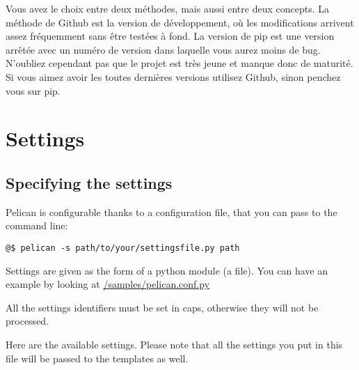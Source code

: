 \documentclass[letterpaper,10pt,english]{manual}
\begin{document}
Vous avez le choix entre deux méthodes, mais aussi entre deux concepts. La méthode
de Github est la version de développement, où les modifications arrivent assez
fréquemment sans être testées à fond. La version de pip est une version arrêtée avec un
numéro de version dans laquelle vous aurez moins de bug. N’oubliez cependant pas
que le projet est très jeune et manque donc de maturité. Si vous aimez avoir les toutes
dernières versions utilisez Github, sinon penchez vous sur pip.

\resetcurrentobjects
\hypertarget{--doc-settings}{}

\section{Settings}


\subsection{Specifying the settings}

Pelican is configurable thanks to a configuration file, that you can pass to
the command line:

\begin{Verbatim}[commandchars=@\[\]]
@$ pelican -s path/to/your/settingsfile.py path
\end{Verbatim}

Settings are given as the form of a python module (a file). You can have an
example by looking at \href{https://github.com/ametaireau/pelican/raw/master/samples/pelican.conf.py}{/samples/pelican.conf.py}

All the settings identifiers must be set in caps, otherwise they will not be
processed.

Here are the available settings. Please note that all the settings you put in
this file will be passed to the templates as well.
\end{document}

